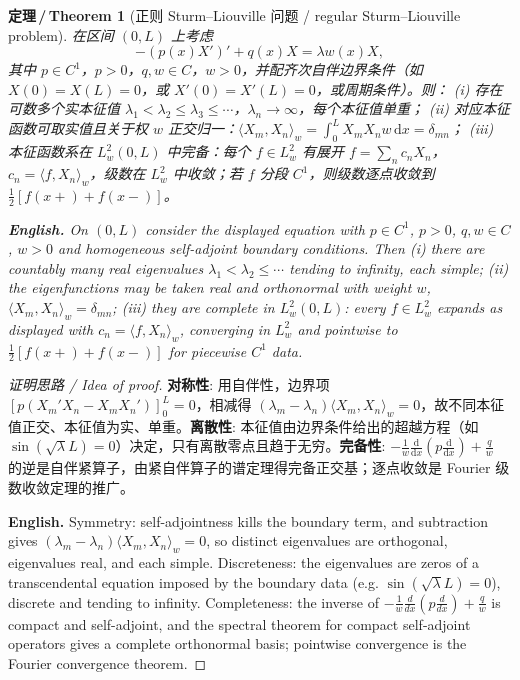 \documentclass[UTF8,11pt,a4paper]{ctexart}
\newcommand{\EN}[1]{\par\noindent \textbf{English.} #1\par}
\newtheorem{theorem}[definition]{定理\,/\,Theorem}
\newcommand{\dd}{\mathrm{d}}
\begin{document}
\begin{theorem}[正则 Sturm--Liouville 问题 / regular Sturm--Liouville problem]\label{thm:sl}
在区间 $(0,L)$ 上考虑
\[
-(p(x)X')'+q(x)X=\lambda w(x)X,
\]
其中 $p\in C^1$，$p>0$，$q,w\in C$，$w>0$，并配齐次自伴边界条件（如 $X(0)=X(L)=0$，或 $X'(0)=X'(L)=0$，或周期条件）。则：
(i) 存在可数多个实本征值 $\lambda_1<\lambda_2\le\lambda_3\le\cdots$，$\lambda_n\to\infty$，每个本征值单重；
(ii) 对应本征函数可取实值且关于权 $w$ 正交归一：$\langle X_m,X_n\rangle_w=\int_0^LX_mX_nw\,\dd x=\delta_{mn}$；
(iii) 本征函数系在 $L^2_w(0,L)$ 中完备：每个 $f\in L^2_w$ 有展开 $f=\sum_nc_nX_n$，$c_n=\langle f,X_n\rangle_w$，级数在 $L^2_w$ 中收敛；若 $f$ 分段 $C^1$，则级数逐点收敛到 $\frac12[f(x+)+f(x-)]$。
\EN{On $(0,L)$ consider the displayed equation with $p\in C^1$, $p>0$, $q,w\in C$, $w>0$ and homogeneous self-adjoint boundary conditions. Then (i) there are countably many real eigenvalues $\lambda_1<\lambda_2\le\cdots$ tending to infinity, each simple; (ii) the eigenfunctions may be taken real and orthonormal with weight $w$, $\langle X_m,X_n\rangle_w=\delta_{mn}$; (iii) they are complete in $L^2_w(0,L)$: every $f\in L^2_w$ expands as displayed with $c_n=\langle f,X_n\rangle_w$, converging in $L^2_w$ and pointwise to $\frac12[f(x+)+f(x-)]$ for piecewise $C^1$ data.}
\end{theorem}

\begin{proof}[证明思路 / Idea of proof]
\textbf{对称性}: 用自伴性，边界项 $[p(X_m'X_n-X_mX_n')]_0^L=0$，相减得 $(\lambda_m-\lambda_n)\langle X_m,X_n\rangle_w=0$，故不同本征值正交、本征值为实、单重。\textbf{离散性}: 本征值由边界条件给出的超越方程（如 $\sin(\sqrt\lambda L)=0$）决定，只有离散零点且趋于无穷。\textbf{完备性}: $-\frac1w\frac{\dd}{\dd x}(p\frac{\dd}{\dd x})+\frac qw$ 的逆是自伴紧算子，由紧自伴算子的谱定理得完备正交基；逐点收敛是 Fourier 级数收敛定理的推广。\EN{Symmetry: self-adjointness kills the boundary term, and subtraction gives $(\lambda_m-\lambda_n)\langle X_m,X_n\rangle_w=0$, so distinct eigenvalues are orthogonal, eigenvalues real, and each simple. Discreteness: the eigenvalues are zeros of a transcendental equation imposed by the boundary data (e.g. $\sin(\sqrt\lambda L)=0$), discrete and tending to infinity. Completeness: the inverse of $-\frac1w\frac{d}{dx}(p\frac{d}{dx})+\frac qw$ is compact and self-adjoint, and the spectral theorem for compact self-adjoint operators gives a complete orthonormal basis; pointwise convergence is the Fourier convergence theorem.}
\end{proof}
\end{document}
